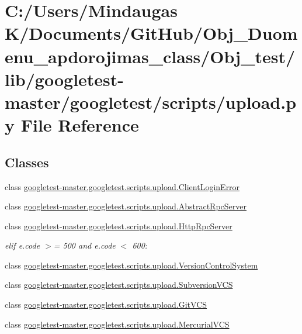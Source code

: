 \hypertarget{_obj__test_2lib_2googletest-master_2googletest_2scripts_2upload_8py}{}\section{C\+:/\+Users/\+Mindaugas K/\+Documents/\+Git\+Hub/\+Obj\+\_\+\+Duomenu\+\_\+apdorojimas\+\_\+class/\+Obj\+\_\+test/lib/googletest-\/master/googletest/scripts/upload.py File Reference}
\label{_obj__test_2lib_2googletest-master_2googletest_2scripts_2upload_8py}
\subsection*{Classes}
\begin{DoxyCompactItemize}
\item 
class \mbox{\hyperlink{classgoogletest-master_1_1googletest_1_1scripts_1_1upload_1_1_client_login_error}{googletest-\/master.\+googletest.\+scripts.\+upload.\+Client\+Login\+Error}}
\item 
class \mbox{\hyperlink{classgoogletest-master_1_1googletest_1_1scripts_1_1upload_1_1_abstract_rpc_server}{googletest-\/master.\+googletest.\+scripts.\+upload.\+Abstract\+Rpc\+Server}}
\item 
class \mbox{\hyperlink{classgoogletest-master_1_1googletest_1_1scripts_1_1upload_1_1_http_rpc_server}{googletest-\/master.\+googletest.\+scripts.\+upload.\+Http\+Rpc\+Server}}
\begin{DoxyCompactList}\small\item\em elif e.\+code $>$= 500 and e.\+code $<$ 600\+: \end{DoxyCompactList}\item 
class \mbox{\hyperlink{classgoogletest-master_1_1googletest_1_1scripts_1_1upload_1_1_version_control_system}{googletest-\/master.\+googletest.\+scripts.\+upload.\+Version\+Control\+System}}
\item 
class \mbox{\hyperlink{classgoogletest-master_1_1googletest_1_1scripts_1_1upload_1_1_subversion_v_c_s}{googletest-\/master.\+googletest.\+scripts.\+upload.\+Subversion\+V\+CS}}
\item 
class \mbox{\hyperlink{classgoogletest-master_1_1googletest_1_1scripts_1_1upload_1_1_git_v_c_s}{googletest-\/master.\+googletest.\+scripts.\+upload.\+Git\+V\+CS}}
\item 
class \mbox{\hyperlink{classgoogletest-master_1_1googletest_1_1scripts_1_1upload_1_1_mercurial_v_c_s}{googletest-\/master.\+googletest.\+scripts.\+upload.\+Mercurial\+V\+CS}}
\end{DoxyCompactItemize}
